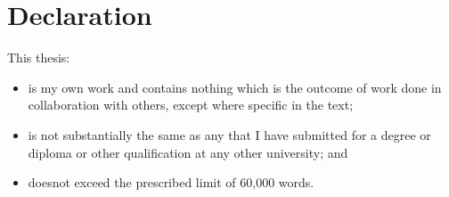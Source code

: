 \chapter*{Declaration}

This thesis:
\begin{itemize}
    \item is my own work and contains nothing which is the outcome of work done
        in collaboration with others, except where specific in the text; 

    \item is not substantially the same as any that I have submitted for a
        degree or diploma or other qualification at any other university; and 
   
    \item doesnot exceed the prescribed limit of 60,000 words.
\end{itemize}

{}

